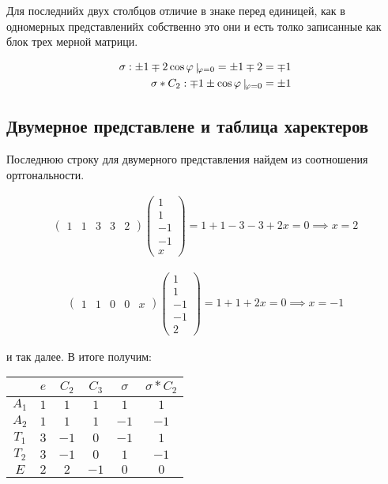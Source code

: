 Для последнийх двух столбцов отличие в знаке перед единицей, как в одномерных представленийх
собственно это они и есть толко записанные как блок трех мерной матрици.


\begin{eqnarray*}
    \sigma: \pm 1 \mp 2 \cos \phi \ \vline_{\phi = 0} = \pm 1 \mp 2 = \mp 1 \\
    \sigma * C_2: \mp 1 \pm \cos \phi \ \vline_{\phi = 0} = \pm 1
\end{eqnarray*}

\subsection{Двумерное представлене и таблица харектеров}

Последнюю строку для двумерного представления найдем из 
соотношения ортгональности.

\begin{gather}
    \begin{pmatrix}
        1 & 1 & 3 & 3 & 2
    \end{pmatrix}
    \begin{pmatrix}
        1 \\ 1 \\ -1 \\ -1 \\ x
    \end{pmatrix}
    = 1 + 1 - 3 - 3 + 2x = 0
    \implies 
    x = 2
\end{gather}


\begin{gather}
    \begin{pmatrix}
        1 & 1 & 0 & 0 & x    
    \end{pmatrix}
    \begin{pmatrix}
        1 \\ 1 \\ -1 \\ -1 \\ 2
    \end{pmatrix}
    = 1 + 1 + 2x = 0
    \implies 
    x = -1
\end{gather}

и так далее. В итоге получим:

\begin{tabular}[pos]{c|c|c|c|c|c}
    & $e$   & $C_2$ & $C_3$ & $\sigma$  & $\sigma*C_2$  \\ \hline
$A_1$   & $1$   & $1$   & $1$   & $1$       & $1$           \\ \hline
$A_2$   & $1$   & $1$   & $1$   & $-1$      & $-1$          \\ \hline
$T_1$   & $3$   & $-1$  & $0$   & $-1$      & $1$           \\ \hline
$T_2$   & $3$   & $-1$  & $0$   & $1$       & $-1$          \\ \hline
$E$     & $2$   & $2$   & $-1$  & $0$       & $0$          
\end{tabular}


